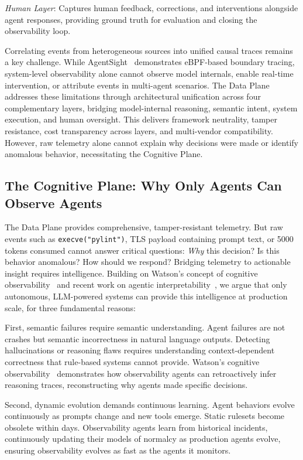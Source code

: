 \documentclass[sigplan,screen,9pt]{acmart}
\begin{document}
\emph{Human Layer}: Captures human feedback, corrections, and interventions alongside agent responses, providing ground truth for evaluation and closing the observability loop.

Correlating events from heterogeneous sources into unified causal traces remains a key challenge. While AgentSight~\cite{zheng2025agentsight} demonstrates eBPF-based boundary tracing, system-level observability alone cannot observe model internals, enable real-time intervention, or attribute events in multi-agent scenarios. The Data Plane addresses these limitations through architectural unification across four complementary layers, bridging model-internal reasoning, semantic intent, system execution, and human oversight. This delivers framework neutrality, tamper resistance, cost transparency across layers, and multi-vendor compatibility. However, raw telemetry alone cannot explain why decisions were made or identify anomalous behavior, necessitating the Cognitive Plane.

\subsection{The Cognitive Plane: Why Only Agents Can Observe Agents}

The Data Plane provides comprehensive, tamper-resistant telemetry. But raw events such as \texttt{execve("pylint")}, TLS payload containing prompt text, or 5000 tokens consumed cannot answer critical questions: \emph{Why} this decision? Is this behavior anomalous? How should we respond? Bridging telemetry to actionable insight requires intelligence. Building on Watson's concept of cognitive observability~\cite{Rombaut2025Watson} and recent work on agentic interpretability~\cite{Kim2025AgenticInterp}, we argue that only autonomous, LLM-powered systems can provide this intelligence at production scale, for three fundamental reasons:

First, semantic failures require semantic understanding. Agent failures are not crashes but semantic incorrectness in natural language outputs. Detecting hallucinations or reasoning flaws requires understanding context-dependent correctness that rule-based systems cannot provide. Watson's cognitive observability~\cite{Rombaut2025Watson} demonstrates how observability agents can retroactively infer reasoning traces, reconstructing why agents made specific decisions.

Second, dynamic evolution demands continuous learning. Agent behaviors evolve continuously as prompts change and new tools emerge. Static rulesets become obsolete within days. Observability agents learn from historical incidents, continuously updating their models of normalcy as production agents evolve, ensuring observability evolves as fast as the agents it monitors.
\end{document}

